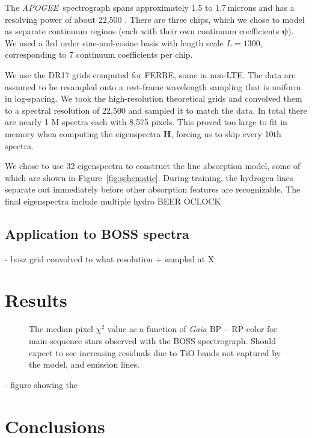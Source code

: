 \documentclass[modern]{aastex631}
\newcommand{\project}[1]{\textit{#1}}
\newcommand{\vecpsi}{\boldsymbol{\psi}}
\newcommand{\vecH}{\mathbf{H}}
\newcommand{\apogee}{\project{APOGEE}}
\newcommand{\todo}[1]{\textcolor{tab:blue}{#1}}
\begin{document}
The \apogee\ spectrograph spans approximately 1.5 to 1.7\,microns and has a resolving power of about 22,500 \citep{wilson}. There are three chips, which we chose to model as separate continuum regions (each with their own continuum coefficients $\vecpsi$). We used a 3rd order sine-and-cosine basis with length scale $L = 1300$, corresponding to 7 continuum coefficients per chip.

We use the \todo{DR17 grids computed for FERRE, some in non-LTE}. The data are assumed to be resampled onto a rest-frame wavelength sampling that is uniform in log-spacing. We took the high-resolution theoretical grids and convolved them to a spectral resolution of 22,500 and sampled it to match the data. In total there are nearly \todo{1 M} spectra each with 8,575 pixels. This proved too large to fit in memory when computing the eigenspectra $\vecH$, forcing us to skip every 10th spectra.

We chose to use 32 eigenspectra to construct the line absorption model, some of which are shown in Figure~\ref{fig:schematic}. During training, the hydrogen lines separate out immediately before other absorption features are recognizable. The final eigenspectra include multiple hydro \todo{BEER OCLOCK}


\subsection{Application to BOSS spectra}

- bosz grid convolved to what resolution + sampled at X


\section{Results}\label{sec:results}


\begin{figure*}
    \caption{The median pixel $\chi^2$ value as a function of \emph{Gaia} $\mathrm{BP} - \mathrm{RP}$ color for main-sequence stars observed with the BOSS spectrograph. \todo{Should expect to see increasing residuals due to TiO bands not captured by the model, and emission lines.}}
\end{figure*}


- figure showing the 

\section{Conclusions}\label{sec:conclusions}
\end{document}

